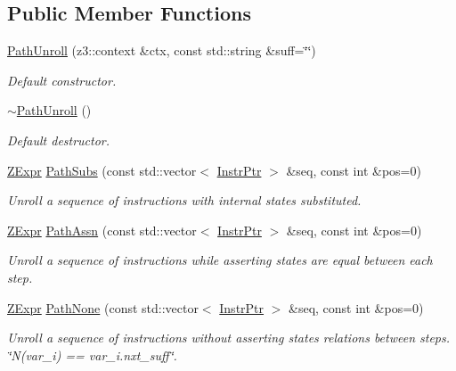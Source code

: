 \subsection*{Public Member Functions}
\begin{DoxyCompactItemize}
\item 
\mbox{\label{classilang_1_1_path_unroll_a0f073cd61314e5f15bade868ed3e5edb}} 
\mbox{\hyperlink{classilang_1_1_path_unroll_a0f073cd61314e5f15bade868ed3e5edb}{Path\+Unroll}} (z3\+::context \&ctx, const std\+::string \&suff=\char`\"{}\char`\"{})
\begin{DoxyCompactList}\small\item\em Default constructor. \end{DoxyCompactList}\item 
\mbox{\label{classilang_1_1_path_unroll_a5a576df2fbdebff5cbbbf8f77c0be41e}} 
\mbox{\hyperlink{classilang_1_1_path_unroll_a5a576df2fbdebff5cbbbf8f77c0be41e}{$\sim$\+Path\+Unroll}} ()
\begin{DoxyCompactList}\small\item\em Default destructor. \end{DoxyCompactList}\item 
\mbox{\hyperlink{classilang_1_1_unroller_a9fd0359e3ffd666f8f92ad3c3ef52673}{Z\+Expr}} \mbox{\hyperlink{classilang_1_1_path_unroll_acef6347d7273597c2574478065af5512}{Path\+Subs}} (const std\+::vector$<$ \mbox{\hyperlink{namespaceilang_af88a19312ae653d687a0d1207bb284f6}{Instr\+Ptr}} $>$ \&seq, const int \&pos=0)
\begin{DoxyCompactList}\small\item\em Unroll a sequence of instructions with internal states substituted. \end{DoxyCompactList}\item 
\mbox{\hyperlink{classilang_1_1_unroller_a9fd0359e3ffd666f8f92ad3c3ef52673}{Z\+Expr}} \mbox{\hyperlink{classilang_1_1_path_unroll_a838d9960d23482e7673bfc77d9399d44}{Path\+Assn}} (const std\+::vector$<$ \mbox{\hyperlink{namespaceilang_af88a19312ae653d687a0d1207bb284f6}{Instr\+Ptr}} $>$ \&seq, const int \&pos=0)
\begin{DoxyCompactList}\small\item\em Unroll a sequence of instructions while asserting states are equal between each step. \end{DoxyCompactList}\item 
\mbox{\hyperlink{classilang_1_1_unroller_a9fd0359e3ffd666f8f92ad3c3ef52673}{Z\+Expr}} \mbox{\hyperlink{classilang_1_1_path_unroll_abd088f982ccfeceb63d5f993e7f91b9e}{Path\+None}} (const std\+::vector$<$ \mbox{\hyperlink{namespaceilang_af88a19312ae653d687a0d1207bb284f6}{Instr\+Ptr}} $>$ \&seq, const int \&pos=0)
\begin{DoxyCompactList}\small\item\em Unroll a sequence of instructions without asserting states relations between steps. \char`\"{}\+N(var\+\_\+i) == var\+\_\+i.\+nxt\+\_\+suff\char`\"{}. \end{DoxyCompactList}\end{DoxyCompactItemize}
